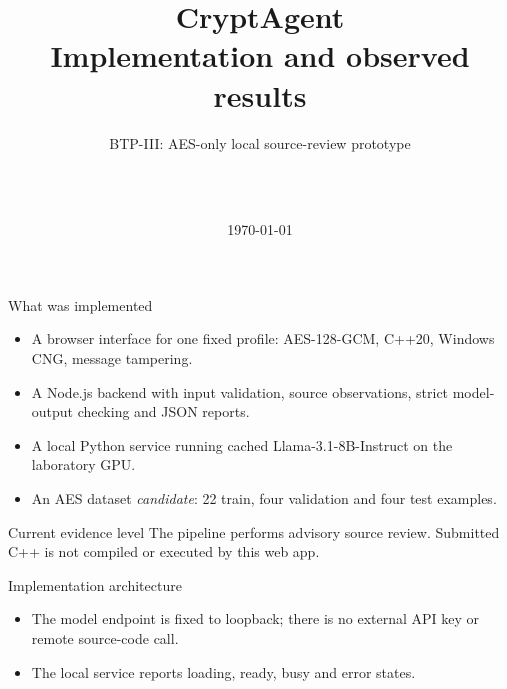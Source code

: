 \documentclass[aspectratio=169,10pt]{beamer}
\title[CryptAgent: BTP-III]{CryptAgent\\Implementation and observed results}
\subtitle{BTP-III: AES-only local source-review prototype}
\author[Three-member team]{\mone\\[0.2em]\mtwo\\[0.2em]\mthree}
\institute{Three-member BTP project team}
\date{\today}
\begin{document}
\begin{frame}\titlepage\end{frame}

\begin{frame}{What was implemented}
\begin{itemize}
\item A browser interface for one fixed profile: AES-128-GCM, C++20, Windows CNG, message tampering.
\item A Node.js backend with input validation, source observations, strict model-output checking and JSON reports.
\item A local Python service running cached Llama-3.1-8B-Instruct on the laboratory GPU.
\item An AES dataset \emph{candidate}: 22 train, four validation and four test examples.
\end{itemize}
\begin{alertblock}{Current evidence level}
The pipeline performs advisory source review. Submitted C++ is not compiled or executed by this web app.
\end{alertblock}
\end{frame}

\begin{frame}{Implementation architecture}
\centering
{}
\vspace{1em}
\begin{itemize}
\item The model endpoint is fixed to loopback; there is no external API key or remote source-code call.
\item The local service reports loading, ready, busy and error states.
\end{itemize}
\end{frame}
\end{document}
